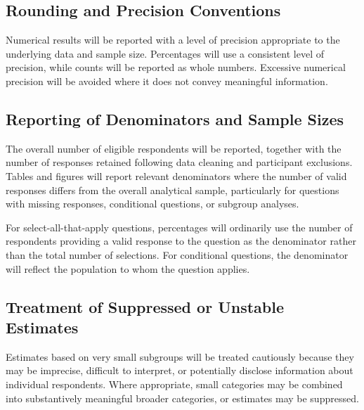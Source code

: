 \subsection{Rounding and Precision Conventions}

Numerical results will be reported with a level of precision appropriate to the underlying data and sample size. Percentages will use a consistent level of precision, while counts will be reported as whole numbers. Excessive numerical precision will be avoided where it does not convey meaningful information.


\subsection{Reporting of Denominators and Sample Sizes}

The overall number of eligible respondents will be reported, together with the number of responses retained following data cleaning and participant exclusions. Tables and figures will report relevant denominators where the number of valid responses differs from the overall analytical sample, particularly for questions with missing responses, conditional questions, or subgroup analyses.

For select-all-that-apply questions, percentages will ordinarily use the number of respondents providing a valid response to the question as the denominator rather than the total number of selections. For conditional questions, the denominator will reflect the population to whom the question applies.


\subsection{Treatment of Suppressed or Unstable Estimates}

Estimates based on very small subgroups will be treated cautiously because they may be imprecise, difficult to interpret, or potentially disclose information about individual respondents. Where appropriate, small categories may be combined into substantively meaningful broader categories, or estimates may be suppressed.

